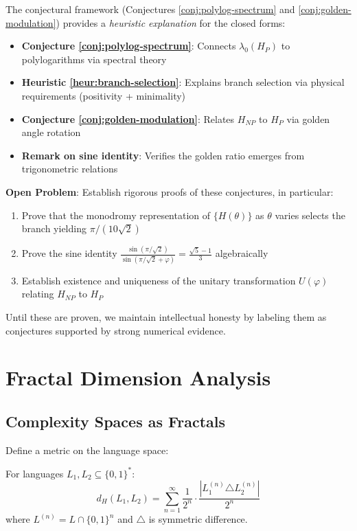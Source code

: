 \begin{remark}
The conjectural framework (Conjectures \ref{conj:polylog-spectrum} and \ref{conj:golden-modulation}) provides a \textit{heuristic explanation} for the closed forms:

\begin{itemize}
\item \textbf{Conjecture \ref{conj:polylog-spectrum}}: Connects $\lambda_0(H_P)$ to polylogarithms via spectral theory
\item \textbf{Heuristic \ref{heur:branch-selection}}: Explains branch selection via physical requirements (positivity + minimality)
\item \textbf{Conjecture \ref{conj:golden-modulation}}: Relates $H_{NP}$ to $H_P$ via golden angle rotation
\item \textbf{Remark on sine identity}: Verifies the golden ratio emerges from trigonometric relations
\end{itemize}

\textbf{Open Problem}: Establish rigorous proofs of these conjectures, in particular:
\begin{enumerate}
\item Prove that the monodromy representation of $\{H(\theta)\}$ as $\theta$ varies selects the branch yielding $\pi/(10\sqrt{2})$
\item Prove the sine identity $\frac{\sin(\pi/\sqrt{2})}{\sin(\pi/\sqrt{2}+\varphi)} = \frac{\sqrt{5}-1}{3}$ algebraically
\item Establish existence and uniqueness of the unitary transformation $U(\varphi)$ relating $H_{NP}$ to $H_P$
\end{enumerate}

Until these are proven, we maintain intellectual honesty by labeling them as conjectures supported by strong numerical evidence.
\end{remark}

\section{Fractal Dimension Analysis}

\subsection{Complexity Spaces as Fractals}

Define a metric on the language space:

\begin{definition}\label{def:hamming-metric}
For languages $L_1, L_2 \subseteq \{0,1\}^*$:
\begin{equation}
d_H(L_1, L_2) = \sum_{n=1}^{\infty} \frac{1}{2^n} \cdot \frac{|L_1^{(n)} \triangle L_2^{(n)}|}{2^n}
\end{equation}
where $L^{(n)} = L \cap \{0,1\}^n$ and $\triangle$ is symmetric difference.
\end{definition}

